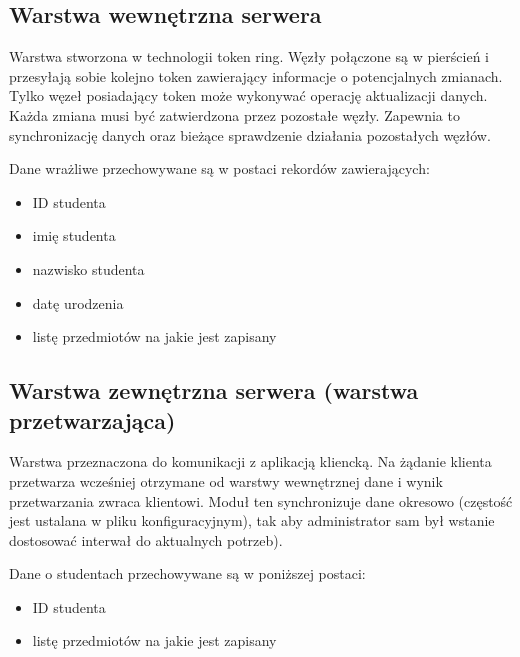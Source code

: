\subsection*[Warstwa wewnętrzna serwera]{Warstwa wewnętrzna serwera}

\par{Warstwa stworzona w technologii token ring. Węzły połączone są w pierścień i przesyłają sobie kolejno token zawierający informacje o potencjalnych zmianach. Tylko węzeł posiadający token może wykonywać operację aktualizacji danych. Każda zmiana musi być zatwierdzona przez pozostałe węzły. Zapewnia to synchronizację danych oraz bieżące sprawdzenie działania pozostałych węzłów.}

\par{Dane wrażliwe przechowywane są w postaci rekordów zawierających:}

\begin{itemize}
\item ID studenta
\item imię studenta
\item nazwisko studenta
\item datę urodzenia
\item listę przedmiotów na jakie jest zapisany
\end{itemize}

\par{}

\subsection*[Warstwa zewnętrzna serwera]{Warstwa zewnętrzna serwera (warstwa przetwarzająca)}

\par{Warstwa przeznaczona do komunikacji z aplikacją kliencką. Na żądanie klienta przetwarza wcześniej otrzymane od warstwy wewnętrznej dane i wynik przetwarzania zwraca klientowi. Moduł ten synchronizuje dane okresowo (częstość jest ustalana w pliku konfiguracyjnym), tak aby administrator sam był wstanie dostosować interwał do aktualnych potrzeb). }

\par{Dane o studentach przechowywane są w poniższej postaci:}

\begin{itemize}
\item ID studenta
\item listę przedmiotów na jakie jest zapisany
\end{itemize}


